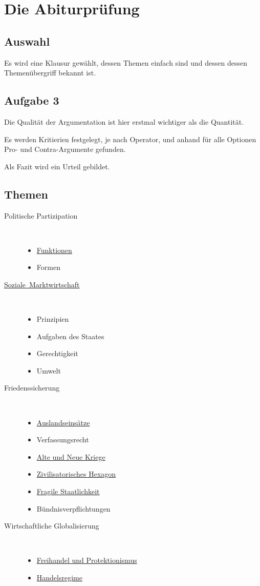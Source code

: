 \documentclass{article}
\begin{document}
\section{Die Abiturprüfung}
\subsection{Auswahl}
Es wird eine Klausur gewählt, dessen Themen einfach sind und dessen dessen Themenübergriff bekannt ist.
 
\subsection{Aufgabe 3}
Die Qualität der Argumentation ist hier erstmal wichtiger als die Quantität.

Es werden Kritierien festgelegt, je nach Operator, und anhand für alle Optionen Pro- und Contra-Argumente gefunden.

Als Fazit wird ein Urteil gebildet.

\subsection{Themen}
\begin{description}
 \item[Politische Partizipation]~
 \begin{itemize}
   \item \hyperref[Partizipationsformen Analysieren]{Funktionen}
   \item Formen
 \end{itemize}
 \item[\mbox{\hyperref[Soziale Marktwirtschaft]{Soziale Marktwirtschaft}}]~
 \begin{itemize}
   \item Prinzipien
   \item Aufgaben des Staates
   \item Gerechtigkeit
   \item Umwelt
 \end{itemize}
 \item[Friedenssicherung]~
 \begin{itemize}
   \item \hyperref[Die Bundeswehr]{Auslandseinsätze}
   \item Verfassungsrecht
   \item \hyperref[Alte und Neue Kriege]{Alte und Neue Kriege}
   \item \hyperref[Das Zivilisatorische Hexagon]{Zivilisatorisches Hexagon}
   \item \hyperref[Fragile Staatlichkeit]{Fragile Staatlichkeit}
   \item Bündnisverpflichtungen 
 \end{itemize}
 \item[Wirtschaftliche Globalisierung]~
 \begin{itemize}
   \item \hyperref[Freihandel und Protektionismus]{Freihandel und Protektionismus}
   \item \hyperref[Handelsregime]{Handelsregime}
 \end{itemize}
\end{description}
\end{document}

